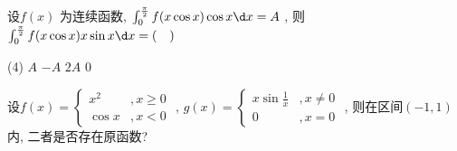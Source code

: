 \begin{question}
    设$ f(x) $ 为连续函数, $ \int_{0}^{\frac{\pi}{2}} f(x \cos x) \cos x \d x = A $ , 则$ \int_{0}^{\frac{\pi}{2}} f(x \cos x) x \sin x \d x = (\quad) $ 
    \begin{tasks}(4)
        \task   $ A $ 
        \task   $ -A $ 
        \task   $ 2A $ 
        \task   $ 0 $ 
    \end{tasks}
\end{question}
\begin{question}
    设$ f(x) = \begin{cases}
        x^2 &, x \ge 0   \\
        \cos x &, x < 0
    \end{cases} $ , $ g(x) = \begin{cases}
        x \sin \frac 1 x &, x \neq 0  \\
        0 &, x = 0
    \end{cases} $ , 则在区间$ (-1, 1) $ 内, 二者是否存在原函数?
\end{question}
